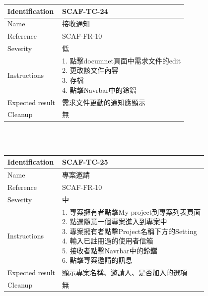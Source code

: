 \documentclass{report}
\begin{document}
\begin{tabularx}{\textwidth}{
  |p{}%
  |p{}|%
  }
  \hline
  \centering Identification &  SCAF-TC-24 \\
  \hline
  \centering Name & 接收通知 \\
  \hline
  \centering Reference & SCAF-FR-10 \\
  \hline
  \centering Severity & 低 \\
  \hline
  \centering Instructions & 
  \makecell[l]{
    1. 點擊documnet頁面中需求文件的edit \\
    2. 更改該文件內容  \\
    3. 存檔  \\
    4. 點擊Navrbar中的鈴鐺
  }\\
  \hline
  \centering Expected result & 需求文件更動的通知應顯示 \\
  \hline
  \centering Cleanup & 無 \\
  \hline
\end{tabularx}
\\
\newline
\\
\begin{tabularx}{\textwidth}{
  |p{}%
  |p{}|%
  }
  \hline
  \centering Identification &  SCAF-TC-25 \\
  \hline
  \centering Name & 專案邀請 \\
  \hline
  \centering Reference & SCAF-FR-10 \\
  \hline
  \centering Severity & 中 \\
  \hline
  \centering Instructions & 
  \makecell[l]{
    1. 專案擁有者點擊My project到專案列表頁面 \\
    2. 點選隨意一個專案進入到專案中 \\
    3. 專案擁有者點擊Project名稱下方的Setting \\
    4. 輸入已註冊過的使用者信箱 \\
    5. 接收者點擊Navrbar中的鈴鐺 \\
    6. 點擊專案邀請的訊息 
  }\\
  \hline
  \centering Expected result & 顯示專案名稱、邀請人、是否加入的選項 \\
  \hline
  \centering Cleanup & 無 \\
  \hline
\end{tabularx}
\end{document}
